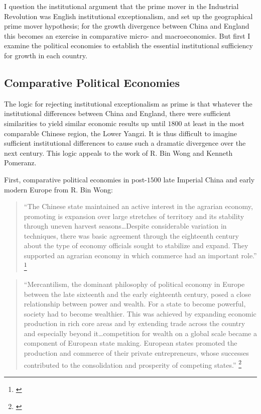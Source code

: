 \documentclass[12pt]{article}
\numberwithin{equation}{section}
\begin{document}
		I question the institutional argument that the prime mover in the Industrial Revolution was English institutional exceptionalism, and set up the geographical prime mover hypothesis; for the growth divergence between China and England this becomes an exercise in comparative micro- and macroeconomics. But first I examine the political economies to establish the essential institutional sufficiency for growth in each country.

		\newpage

		\subsection{Comparative Political Economies }
		
		The logic for rejecting institutional exceptionalism as prime is that whatever the institutional differences between China and England, there were sufficient similarities to yield similar economic results up until $1800$ at least in the most comparable Chinese region, the Lower Yangzi. It is thus difficult to imagine sufficient institutional differences to cause such a dramatic divergence over the next century. This logic appeals to the work of R. Bin Wong and Kenneth Pomeranz.
		
		First, comparative political economies in post-$1500$ late Imperial China and early modern Europe from R. Bin Wong:
		
		\begin{quotation}
		
		``The Chinese state maintained an active interest in the agrarian economy, promoting is expansion over large stretches of territory and its stability through uneven harvest seasons\ldots Despite considerable variation in techniques, there was basic agreement through the eighteenth century about the type of economy officials sought to stabilize and expand. They supported an agrarian economy in which commerce had an important role.'' \footnote{\citet[pp.~115 -- 116]{wong_china_1997}}
		\end{quotation}
		
		\begin{quotation}
		``Mercantilism, the dominant philosophy of political economy in Europe between the late sixteenth and the early eighteenth century, posed a close relationship between power and wealth. For a state to become powerful, society had to become wealthier. This was achieved by expanding economic production in rich core areas and by extending trade across the country and especially beyond it\ldots competition for wealth on a global scale became a component of European state making. European states promoted the production and commerce of their private entrepreneurs, whose successes contributed to the consolidation and prosperity of competing states.'' \footnote{\citet[p.~140]{wong_china_1997}}
		
		\end{quotation}
		
\end{document}
